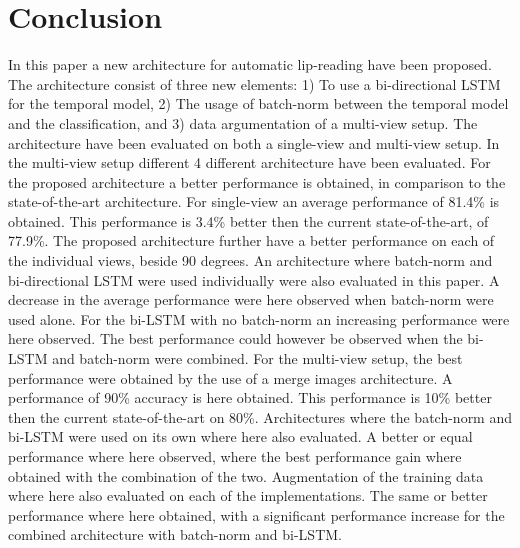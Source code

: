 \section{Conclusion}
In this paper a new architecture for automatic lip-reading have been proposed.
The architecture consist of three new elements:
1) To use a bi-directional LSTM for the temporal model, 
2) The usage of batch-norm between the temporal model and the classification, and
3) data argumentation of a multi-view setup.
The architecture have been evaluated on both a single-view and multi-view setup.
In the multi-view setup different 4 different architecture have been evaluated.
For the proposed architecture a better performance is obtained, in comparison to the state-of-the-art architecture.
For single-view an average performance of 81.4\% is obtained.
This performance is 3.4\% better then the current state-of-the-art, of 77.9\%. 
The proposed architecture further have a better performance on each of the individual views, beside 90 degrees.
An architecture where batch-norm and bi-directional LSTM were used individually were also evaluated in this paper.
A decrease in the average performance were here observed when batch-norm were used alone.
For the bi-LSTM with no batch-norm an increasing performance were here observed.
The best performance could however be observed when the bi-LSTM and batch-norm were combined.
For the multi-view setup, the best performance were obtained by the use of a merge images architecture.
A performance of 90\% accuracy is here obtained.
This performance is 10\% better then the current state-of-the-art on 80\%.
Architectures where the batch-norm and bi-LSTM were used on its own where here also evaluated.
A better or equal performance where here observed, where the best performance gain where obtained with the combination of the two.
Augmentation of the training data where here also evaluated on each of the implementations.
The same or better performance where here obtained, with a significant performance increase for the combined architecture with batch-norm and bi-LSTM.
